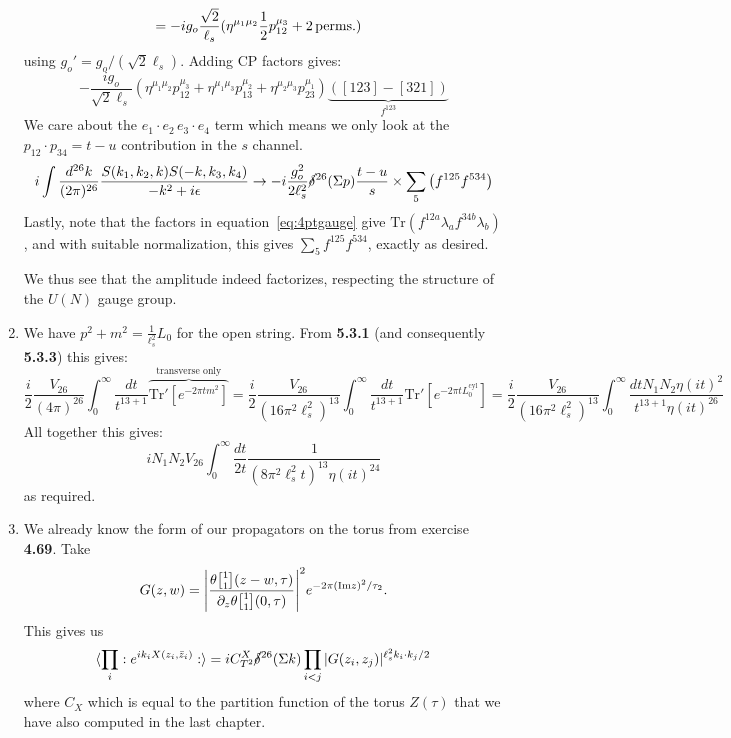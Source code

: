 \documentclass[11pt, class=article, crop=false]{standalone}
\begin{document}
\begin{enumerate}
\[\begin{aligned}
		&= -i g_o \frac{\sqrt 2}{\ell_s} (\eta^{\mu_1 \mu_2}\frac12 p_{12}^{\mu_3} + 2 \,\mathrm{perms.}) 
	\end{aligned}
	\]
	using $g_o' = g_o/(\sqrt 2 \ell_s)$. Adding CP factors gives:
	\[
		-\frac{i g_o}{\sqrt 2 \ell_s} (\eta^{\mu_1 \mu_2} p_{12}^{\mu_3} + \eta^{\mu_1 \mu_3} p_{13}^{\mu_2} + \eta^{\mu_2 \mu_3} p_{23}^{\mu_1}) \underbrace{([123] - [321])}_{f^{123}}
	\]
	We care about the $e_1 \cdot e_2 \, e_3 \cdot e_4$ term which means we only look at the $p_{12} \cdot p_{34} = t - u$ contribution in the $s$ channel.
	\[
		i \int \frac{d^{26}k}{(2\pi)^{26}} \frac{S(k_1, k_2, k) S(-k, k_3, k_4)}{-k^2 + i \epsilon} \to - i \frac{g_o^2}{2 \ell_s^2} \cancel\delta^{26}(\Sigma p) \frac{t-u}{s} \times \sum_{5} \left( f^{125} f^{534} \right)
	\]
	Lastly, note that the factors in equation~\eqref{eq:4ptgauge} give $\mathrm{Tr}(f^{12a} \lambda_a f^{34b} \lambda_b)$, and with suitable normalization, this gives $\sum_5 f^{125} f^{534}$, exactly as desired. 
	
	We thus see that the amplitude indeed factorizes, respecting the structure of the $U(N)$ gauge group. 
	
	\item We have $p^2 + m^2 = \frac{1}{\ell_s^2} L_0$ for the open string. From \textbf{5.3.1} (and consequently \textbf{5.3.3}) this gives:
	\[
		\frac{i}{2} \frac{V_{26}}{(4\pi)^{26}} \int_0^\infty \frac{dt}{t^{13+1}} \overbrace{\mathrm{Tr'}[e^{-2\pi t m^2}]}^{\text{transverse only}} = \frac{i}{2} \frac{V_{26}}{(16\pi^2 \ell_s^2)^{13}} \int_0^\infty \frac{dt}{t^{13+1}} \mathrm{Tr'}[e^{-2\pi t L_0^{\text{cyl}}}] =  \frac{i}{2} \frac{V_{26}}{(16\pi^2 \ell_s^2)^{13}} \int_0^\infty \frac{dt N_1 N_2 \eta(i t)^2}{t^{13+1} \eta(i t)^{26}} 
	\]
	All together this gives:
	\[
		i N_1 N_2 V_{26} \int_0^\infty \frac{dt}{2 t} \frac{1}{(8 \pi^2 \ell_s^2 t)^{13} \eta(it)^{24}}
	\]
	as required.
	\item We already know the form of our propagators on the torus from exercise \textbf{4.69}. Take 
	\[
		G(z, w)= \Bigg|\frac{\theta\twist11 (z-w, \tau)}{\d_z \theta \twist11 (0, \tau)} \Bigg|^2 e^{-2 \pi (\mathrm{Im} z)^2 / \tau_2}.
	\]
	This gives us
	\[
		\braket{\prod_{i} :e^{i k_i X(z_i, \bar z_i)}:}  = i C^X_{T^2} \cancel\delta^{26} (\Sigma k) \prod_{i < j} |G(z_i, z_j)|^{\ell_s^2 k_i \cdot k_j/2}
	\]
	where $C_X$ which is equal to the partition function of the torus $Z(\tau)$ that we have also computed in the last chapter.
	

\end{enumerate}
\end{document}
